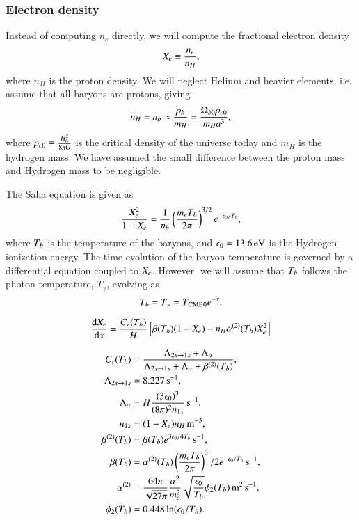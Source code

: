 \subsubsection{Electron density } \label{sssec:M2_electron_density}
Instead of computing $n_e$ directly, we will compute the fractional electron density
\begin{equation} \label{eq:M2:theory:X_e_definition}
    X_e \equiv \frac{n_e}{n_H},
\end{equation}
where $n_H$ is the proton density. We will neglect Helium and heavier elements, i.e. assume that all baryons are protons, giving  
\begin{equation} \label{eq:M2:theory:helium_baryon_number_density}
    n_H=n_b \approx \frac{\rho_b}{m_H} = \frac{\Omega_{b0} \rho_{c0}}{m_H a^3},
\end{equation}
where $\rho_{c0}\equiv \frac{ H_0^2}{8\pi G}$ is the critical density of the universe today and $m_H$ is the hydrogen mass. We have assumed the small difference between the proton mass and Hydrogen mass to be negligible.


The Saha equation is given as 
\begin{equation} \label{eq:M2:theory:saha_equation}
    \frac{X_e^2}{1-X_e} = \frac{1}{n_b} \left( \frac{m_e T_b}{2\pi} \right)^{3/2} e^{-\epsilon_0 / T_b},
\end{equation}
where $T_b$ is the temperature of the baryons, and $\epsilon_0=13.6\,\mathrm{eV}$ is the Hydrogen ionization energy. The time evolution of the baryon temperature is governed by a differential equation coupled to $X_e$. However, we will assume that $T_b$ follows the photon temperature, $T_\gamma$, evolving as 
\begin{equation}
    T_b = T_\gamma = T_\mathrm{CMB0} e^{-x}.
\end{equation}

\begin{equation}
    \dv{X_e}{x} = \frac{C_r(T_b)}{H}\left[ \beta(T_b)(1-X_e) - n_H \alpha^{(2)}(T_b) X_e^2  \right]
\end{equation}


\begin{align}
    C_r(T_b) &= \frac{\Lambda_{2s\to1s} + \Lambda_\alpha}{\Lambda_{2s\to1s} + \Lambda_\alpha + \beta^{(2)}(T_b)}, \\
    \Lambda_{2s\to1s} &= 8.227\,\mathrm{s^{-1}}, \\
    \Lambda_\alpha &= H \frac{(3\epsilon_0)^3}{(8\pi)^2 n_{1s}}\,\mathrm{s^{-1}}, \\
    n_{1s} &= (1-X_e) n_H \,\mathrm{m^{-3}}, \\
    \beta^{(2)}(T_b) &= \beta(T_b) e^{3\epsilon_0/4T_b} \,\mathrm{s^{-1}},\\
    \beta(T_b) &= \alpha^{(2)}(T_b) \left( \frac{m_e T_b}{2\pi} \right)^3/2 e^{-\epsilon_0/T_b} \,\mathrm{s^{-1}}, \\
    \alpha^{(2)} &= \frac{64\pi}{\sqrt{27\pi}} \frac{\alpha^2}{m_e^2} \sqrt{\frac{\epsilon_0}{T_b}} \phi_2(T_b)\,\mathrm{m^2\,s^{-1}}, \\
    \phi_2(T_b) &= 0.448\ln(\epsilon_0/T_b).
\end{align}